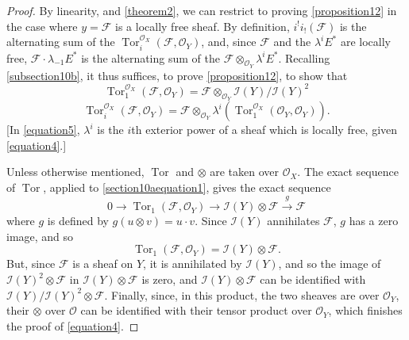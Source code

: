 \documentclass{article}
\theoremstyle{plain}
\theoremstyle{definition}
\newcommand{\sh}[1]{{\mathscr{#1}}}
\DeclareMathOperator{\Tor}{Tor}
\newcommand{\oldpage}[1]{\marginpar{\footnotesize$\Big\vert$ \textit{p.~#1}}}
\begin{document}
\begin{proof}
  By linearity, and \cref{theorem2}, we can restrict to proving \cref{proposition12} in the case where $y=\sh{F}$ is a locally free sheaf.
  By definition, $i^!i_!(\sh{F})$ is the alternating sum of the $\Tor_i^{\sh{O}_X}(\sh{F},\sh{O}_Y)$, and, since $\sh{F}$ and the $\lambda^i E^*$ are locally free, $\sh{F}\cdot\lambda_{-1}E^*$ is the alternating sum of the $\sh{F}\otimes_{\sh{O}_Y}\lambda^i E^*$.
  Recalling \cref{subsection10b}, it thus suffices, to prove \cref{proposition12}, to show that
  \[
  \label{equation4}
    \Tor_1^{\sh{O}_X}(\sh{F},\sh{O}_Y)
    = \sh{F} \otimes_{\sh{O}_Y} \sh{I}(Y)/\sh{I}(Y)^2
    \tag{4}
  \]
  \[
  \label{equation5}
    \Tor_i^{\sh{O}_X}(\sh{F},\sh{O}_Y)
    = \sh{F} \otimes_{\sh{O}_Y} \lambda^i(\Tor_1^{\sh{O}_X}(\sh{O}_Y,\sh{O}_Y)).
    \tag{5}
  \]
  [In \cref{equation5}, $\lambda^i$ is the $i$th exterior power of a sheaf which is locally free, given \cref{equation4}.]

  Unless otherwise mentioned, $\Tor$ and $\otimes$ are taken over $\sh{O}_X$.
  The exact sequence of $\Tor$, applied to \cref{section10aequation1}, gives the exact sequence
  \[
    0 \to \Tor_1(\sh{F},\sh{O}_Y) \to \sh{I}(Y)\otimes\sh{F} \xrightarrow{g} \sh{F}
  \]
  where $g$ is defined by $g(u\otimes v)=u\cdot v$.
  Since $\sh{I}(Y)$ annihilates $\sh{F}$, $g$ has a zero image, and so
  \[
    \Tor_1(\sh{F},\sh{O}_Y) = \sh{I}(Y)\otimes\sh{F}.
  \]
  But, since $\sh{F}$ is a sheaf on $Y$, it is annihilated by $\sh{I}(Y)$, and so the image of $\sh{I}(Y)^2\otimes\sh{F}$ in $\sh{I}(Y)\otimes\sh{F}$ is zero, and $\sh{I}(Y)\otimes\sh{F}$ can be identified with $\sh{I}(Y)/\sh{I}(Y)^2\otimes\sh{F}$.
  Finally, since, in this product, the two sheaves are
\oldpage{123}
  over $\sh{O}_Y$, their $\otimes$ over $\sh{O}$ can be identified with their tensor product over $\sh{O}_Y$, which finishes the proof of \cref{equation4}.


\end{proof}
\end{document}
